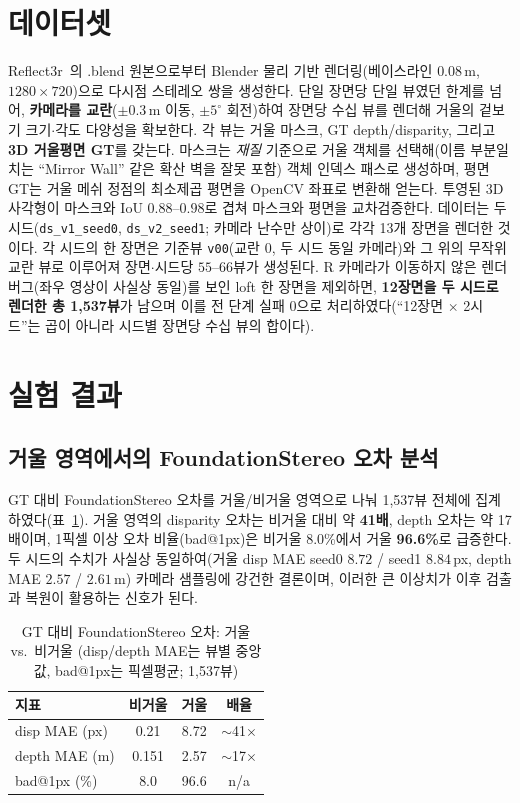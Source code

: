 \documentclass[10pt,a4paper]{article}
\begin{document}
\section{데이터셋}
Reflect3r~\cite{reflect3r2026}의 .blend 원본으로부터 Blender 물리 기반 렌더링(베이스라인 $0.08$\,m, $1280\times720$)으로 다시점 스테레오 쌍을 생성한다. 단일 장면당 단일 뷰였던 한계를 넘어, \textbf{카메라를 교란}($\pm0.3$\,m 이동, $\pm5^\circ$ 회전)하여 장면당 수십 뷰를 렌더해 거울의 겉보기 크기$\cdot$각도 다양성을 확보한다. 각 뷰는 거울 마스크, GT depth/disparity, 그리고 \textbf{3D 거울평면 GT}를 갖는다. 마스크는 \emph{재질} 기준으로 거울 객체를 선택해(이름 부분일치는 ``Mirror Wall'' 같은 확산 벽을 잘못 포함) 객체 인덱스 패스로 생성하며, 평면 GT는 거울 메쉬 정점의 최소제곱 평면을 OpenCV 좌표로 변환해 얻는다. 투영된 3D 사각형이 마스크와 IoU $0.88$--$0.98$로 겹쳐 마스크와 평면을 교차검증한다. 데이터는 두 시드(\texttt{ds\_v1\_seed0}, \texttt{ds\_v2\_seed1}; 카메라 난수만 상이)로 각각 13개 장면을 렌더한 것이다. 각 시드의 한 장면은 기준뷰 \texttt{v00}(교란 0, 두 시드 동일 카메라)와 그 위의 무작위 교란 뷰로 이루어져 장면$\cdot$시드당 $55$--$66$뷰가 생성된다. R 카메라가 이동하지 않은 렌더 버그(좌우 영상이 사실상 동일)를 보인 loft 한 장면을 제외하면, \textbf{12장면을 두 시드로 렌더한 총 1{,}537뷰}가 남으며 이를 전 단계 실패 0으로 처리하였다(``12장면 $\times$ 2시드''는 곱이 아니라 시드별 장면당 수십 뷰의 합이다).

\section{실험 결과}

\subsection{거울 영역에서의 FoundationStereo 오차 분석}
GT 대비 FoundationStereo 오차를 거울/비거울 영역으로 나눠 1{,}537뷰 전체에 집계하였다(표~\ref{tab:fs_break}). 거울 영역의 disparity 오차는 비거울 대비 약 \textbf{41배}, depth 오차는 약 17배이며, 1픽셀 이상 오차 비율(bad@1px)은 비거울 8.0\%에서 거울 \textbf{96.6\%}로 급증한다. 두 시드의 수치가 사실상 동일하여(거울 disp MAE seed0 $8.72$ / seed1 $8.84$\,px, depth MAE $2.57$ / $2.61$\,m) 카메라 샘플링에 강건한 결론이며, 이러한 큰 이상치가 이후 검출과 복원이 활용하는 신호가 된다.

\begin{table}[h]
\centering
\caption{GT 대비 FoundationStereo 오차: 거울 vs.\ 비거울 (disp/depth MAE는 뷰별 중앙값, bad@1px는 픽셀평균; 1{,}537뷰)}
\label{tab:fs_break}
\begin{tabular}{lccc}
\toprule
지표 & 비거울 & 거울 & 배율 \\
\midrule
disp MAE (px)  & 0.21 & 8.72 & $\sim$41$\times$ \\
depth MAE (m)  & 0.151 & 2.57 & $\sim$17$\times$ \\
bad@1px (\%)   & 8.0 & 96.6 & n/a \\
\bottomrule
\end{tabular}
\end{table}
\end{document}
